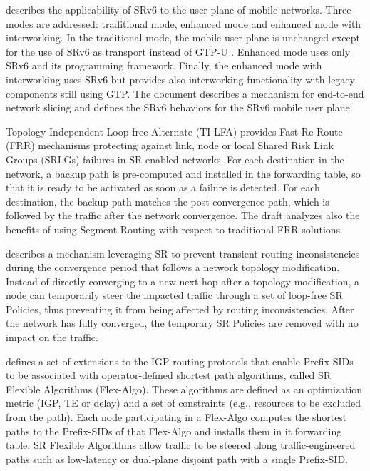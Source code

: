 \cite{id-srv6-mobile-uplane} describes the applicability of SRv6 to the user plane of mobile networks. Three modes are addressed: traditional mode, enhanced mode and enhanced mode with interworking. In the traditional mode, the mobile user plane is unchanged except for the use of SRv6 as transport instead of GTP-U \cite{gtpu}. Enhanced mode uses only SRv6 and its programming framework. Finally, the enhanced mode with interworking uses SRv6 but provides also interworking functionality with legacy components still using GTP. The document describes a mechanism for end-to-end network slicing and defines the SRv6 behaviors for the SRv6 mobile user plane.

Topology Independent Loop-free Alternate (TI-LFA) \cite{id-segment-routing-ti-lfa} provides Fast Re-Route (FRR) mechanisms protecting against link, node or local Shared Risk Link Groups (SRLGs) failures in SR enabled networks. For each destination in the network, a backup path is pre-computed and installed in the forwarding table, so that it is ready to be activated as soon as a failure is detected. For each destination, the backup path matches the post-convergence path, which is followed by the traffic after the network convergence. The draft analyzes also the benefits of using Segment Routing with respect to traditional FRR solutions.

\cite{id-segment-routing-uloop} describes a mechanism leveraging SR to prevent transient routing inconsistencies during the convergence period that follows a network topology modification. Instead of directly converging to a new next-hop after a topology modification, a node can temporarily steer the impacted traffic through a set of loop-free SR Policies, thus preventing it from being affected by routing inconsistencies. After the network has fully converged, the temporary SR Policies are removed with no impact on the traffic.

\cite{ietf-lsr-flex-algo} defines a set of extensions to the IGP routing protocols that enable Prefix-SIDs to be associated with operator-defined shortest path algorithms, called SR Flexible Algorithms (Flex-Algo). These algorithms are defined as an optimization metric (IGP, TE or delay) and a set of constraints (e.g., resources to be excluded from the path). Each node participating in a Flex-Algo computes the shortest paths to the Prefix-SIDs of that Flex-Algo and installs them in it forwarding table. SR Flexible Algorithms allow traffic to be steered along traffic-engineered paths such as low-latency or dual-plane disjoint path with a single Prefix-SID.

